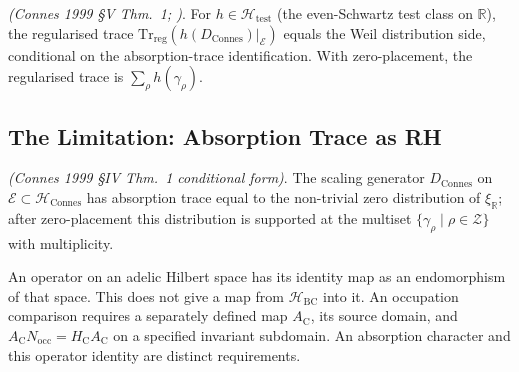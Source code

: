 \begin{theorem}
\label{v4-arith:w9-r4:thm:connes-trace-eq}
\ClaimStatusProvedElsewhere \emph{(Connes 1999 \S V Thm.~1;
)}. For
\(h\in\mathcal{H}_{\mathrm{test}}\) (the even-Schwartz test class on
\(\mathbb{R}\)), the regularised trace
\(\mathrm{Tr}_{\mathrm{reg}}(h(D_{\mathrm{Connes}})|_{\mathcal{E}})\)
equals the Weil distribution side, conditional on the
absorption-trace identification. With zero-placement, the regularised
trace is \(\sum_{\rho}h(\gamma_{\rho})\).
\end{theorem}

\subsection{The Limitation: Absorption Trace as RH}
\label{v4-arith:w9-r4:connes-1999:limitation}

\begin{theorem}
\label{v4-arith:w9-r4:thm:connes-absorption}
\ClaimStatusConjectured \emph{(Connes 1999 \S IV Thm.~1 conditional
form)}. The scaling generator \(D_{\mathrm{Connes}}\) on
\(\mathcal{E}\subset\mathcal{H}_{\mathrm{Connes}}\) has absorption
trace equal to the non-trivial zero distribution of
\(\xi_{\mathbb R}\); after zero-placement this distribution is
supported at the multiset
\(\{\gamma_{\rho}\mid\rho\in\mathcal{Z}\}\) with multiplicity.
\end{theorem}

\begin{remark}
\label{v4-arith:w9-r4:rem:connes-not-uncond}
An operator on an adelic Hilbert space has its identity map as an
endomorphism of that space. This does not give a map from
$\mathcal H_{\mathrm{BC}}$ into it. An occupation comparison requires
a separately defined map $A_{\mathrm C}$, its source domain, and
$A_{\mathrm C}N_{\mathrm{occ}}=H_{\mathrm C}A_{\mathrm C}$ on a
specified invariant subdomain. An absorption character and this
operator identity are distinct requirements.
\end{remark}

